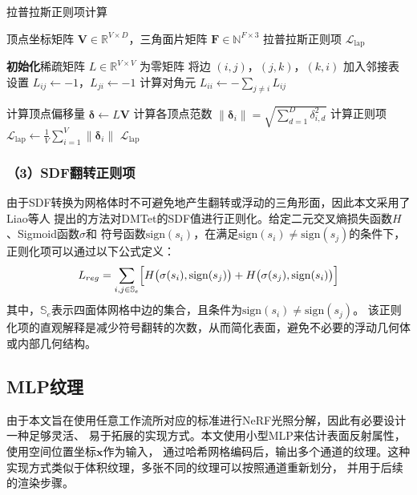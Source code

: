 \begin{algorithm}
  \caption{拉普拉斯正则项计算} %
  \label{alg:lapreg}
  \begin{algorithmic}[1]
  \REQUIRE 顶点坐标矩阵 $\bm{V} \in \mathbb{R}^{V \times D}$，三角面片矩阵 $\bm{F} \in \mathbb{N}^{F \times 3}$
  \ENSURE 拉普拉斯正则项 $\mathcal{L}_{\text{lap}}$
  
  \STATE \textbf{初始化}稀疏矩阵 $L \in \mathbb{R}^{V \times V}$ 为零矩阵
      \STATE 将边 $(i, j)$，$(j, k)$，$(k, i)$ 加入邻接表
  \ENDFOR
      \STATE 设置 $L_{ij} \gets -1$，$L_{ji} \gets -1$
  \ENDFOR
      \STATE 计算对角元 $L_{ii} \gets -\sum_{j \neq i} L_{ij}$
  \ENDFOR

  \STATE 计算顶点偏移量 $\bm{\delta} \gets L \bm{V}$
  \STATE 计算各顶点范数 $\|\bm{\delta}_i\| = \sqrt{\sum_{d=1}^D \delta_{i,d}^2}$
  \STATE 计算正则项 $\mathcal{L}_{\text{lap}} \gets \frac{1}{V} \sum_{i=1}^{V} \|\bm{\delta}_i\|$
  \STATE \RETURN $\mathcal{L}_{\text{lap}}$
  \end{algorithmic}
\end{algorithm}

\subsubsection*{（3）SDF翻转正则项}

由于SDF转换为网格体时不可避免地产生翻转或浮动的三角形面，因此本文采用了Liao等人\cite{Liao_2018}
提出的方法对DMTet的SDF值进行正则化。给定二元交叉熵损失函数$H$、Sigmoid函数$\sigma$和
符号函数$\mathrm{sign}(s_i)$，在满足$\mathrm{sign}(s_i)\neq\mathrm{sign}(s_j)$的条件下，
正则化项可以通过以下公式定义：
\begin{equation}\label{eq:Lreg}
L_{reg}=\sum_{i,j\in\mathbb{S}_e}\Bigl[H\bigl(\sigma(s_i),\mathrm{sign}(s_j)\bigr)+H\bigl(\sigma(s_j),\mathrm{sign}(s_i)\bigr)\Bigr]
\end{equation}
其中，$\mathbb{S}_e$表示四面体网格中边的集合，且条件为$\mathrm{sign}(s_i)\neq\mathrm{sign}(s_j)$。
该正则化项的直观解释是减少符号翻转的次数，从而简化表面，避免不必要的浮动几何体或内部几何结构。

\subsection{MLP纹理} \label{sec:mlp_texture}
由于本文旨在使用任意工作流所对应的标准进行NeRF光照分解，因此有必要设计一种足够灵活、
易于拓展的实现方式。本文使用小型MLP来估计表面反射属性，使用空间位置坐标$\bm{x}$作为输入，
通过哈希网格编码后，输出多个通道的纹理。这种实现方式类似于体积纹理，多张不同的纹理可以按照通道重新划分，
并用于后续的渲染步骤。

